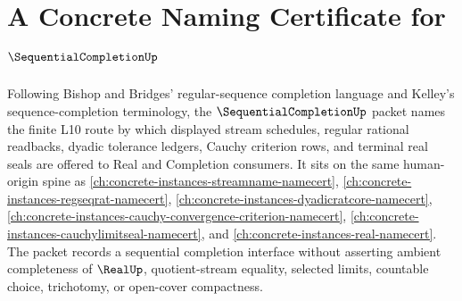 \chapter{A Concrete Naming Certificate for $\SequentialCompletionUp$}
\label{ch:concrete-instances-sequential-completion-namecert}

Following Bishop and Bridges' regular-sequence completion language and Kelley's sequence-completion terminology, the $\SequentialCompletionUp$ packet names the finite L10 route by which displayed stream schedules, regular rational readbacks, dyadic tolerance ledgers, Cauchy criterion rows, and terminal real seals are offered to Real and Completion consumers. It sits on the same human-origin spine as \autoref{ch:concrete-instances-streamname-namecert}, \autoref{ch:concrete-instances-regseqrat-namecert}, \autoref{ch:concrete-instances-dyadicratcore-namecert}, \autoref{ch:concrete-instances-cauchy-convergence-criterion-namecert}, \autoref{ch:concrete-instances-cauchylimitseal-namecert}, and \autoref{ch:concrete-instances-real-namecert}. The packet records a sequential completion interface without asserting ambient completeness of $\RealUp$, quotient-stream equality, selected limits, countable choice, trichotomy, or open-cover compactness.

